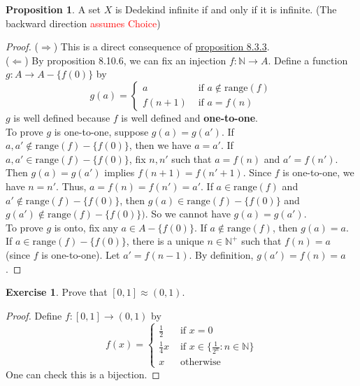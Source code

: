\documentclass[14pt]{article}
\theoremstyle{definition}
\newtheorem{proposition}[definition]{Proposition}
\newtheorem*{exercise}{Exercise}
\newcommand{\fun}[3]{#1\colon #2\rightarrow#3}
\newcommand{\bb}[1]{\mathbb{#1}}
\begin{document}
\hypertarget{proposition 8.10.8}{\begin{proposition}
    A set $X$ is Dedekind infinite if and only if it is infinite. (The backward direction 
    \textcolor{red}{assumes Choice})
\end{proposition}}
\begin{proof}
    ($\Rightarrow$) This is a direct consequence of \hyperlink{proposition 8.3.3}{proposition 8.3.3}.\\
    ($\Leftarrow$) By proposition 8.10.6, we can fix an injection $\fun{f}{\bb{N}}{A}$.
    Define a function $\fun{g}{A}{A-\{f(0)\}}$ by 
    \begin{equation*}
        g(a)=\begin{cases}
            a & \text{ if } a\not\in \mathrm{range}(f)\\
            f(n+1)&\text{ if } a=f(n)
        \end{cases}
    \end{equation*}
    $g$ is well defined because $f$ is well defined and \textbf{one-to-one}.\\
    To prove $g$ is one-to-one, suppose $g(a)=g(a')$. If $a,a'\not\in \mathrm{range}(f)-\{f(0)\}$,
    then we have $a=a'$. If $a, a'\in \mathrm{range}(f)-\{f(0)\}$, fix $n,n'$ such that 
    $a=f(n)$ and $a'=f(n')$.  Then $g(a)=g(a')$ implies $f(n+1)=f(n'+1)$. Since $f$ is one-to-one, 
    we have $n=n'$. Thus, $a=f(n)=f(n')=a'$. If $a\in\mathrm{range}(f)$ and 
    $a'\not\in \mathrm{range}(f)-\{f(0)\}$, then $g(a)\in \mathrm{range}(f)-\{f(0)\}$ and 
    $g(a')\not\in \mathrm{range}(f)-\{f(0)\})$. So we cannot have $g(a)=g(a')$.\\
    To prove $g$ is onto, fix any $a\in A-\{f(0)\}$. If $a\not\in \mathrm{range}(f)$, then 
    $g(a)=a$. If $a\in\mathrm{range}(f)-\{f(0)\}$, there is a unique $n\in\bb{N}^+$ 
    such that $f(n)=a$ (since $f$ is one-to-one). Let $a'=f(n-1)$. By definition, 
    $g(a')=f(n)=a$. 

\end{proof}

\begin{exercise}
Prove that  $[0,1]\approx(0,1)$.
\end{exercise}
\begin{proof}
    Define $\fun{f}{[0,1]}{(0,1)}$ by
    \begin{equation*}
        f(x)=\begin{cases}
            \frac{1}{2} & \text{ if } x=0\\
            \frac{1}{4}x & \text{ if } x\in\{\frac{1}{2^n}\colon n\in\bb{N}\}\\
            x & \text{ otherwise }
        \end{cases}
    \end{equation*}
   One can check this is a bijection.
\end{proof}
\end{document}
